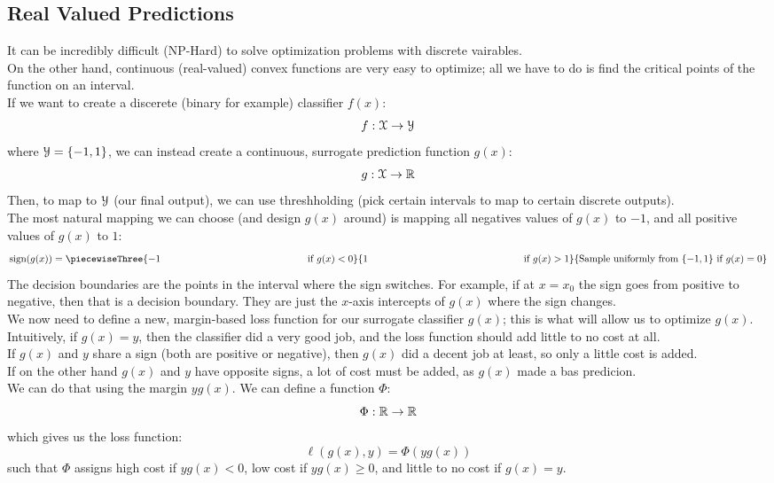 \documentclass[12pt]{article}
\begin{document}
\newpage

\subsection*{Real Valued Predictions}

It can be incredibly difficult (NP-Hard)
to solve optimization problems with
discrete vairables. \\
On the other hand, continuous (real-valued)
convex functions are very easy to optimize;
all we have to do is find the critical
points of the function on an interval. \\

If we want to create a discerete
(binary for example)
classifier $f(x)$:
\[ f: \mathcal{X} \to \mathcal{Y} \]
where $\mathcal{Y} = \{-1, 1\}$,
we can instead create
a continuous,
surrogate prediction function $g(x)$:
\[ g: \mathcal{X} \to \mathbb{R} \]
Then, to map to $\mathcal{Y}$ (our final output),
we can use threshholding 
(pick certain intervals to map to certain
discrete outputs). \\
The most natural mapping we can choose 
(and design $g(x)$ around)
is mapping all negatives values of $g(x)$
to $-1$,
and all positive values of $g(x)$ to $1$:
\[ \sign(g(x))
= \piecewiseThree{-1 \hspace{146pt} \IF g(x) < 0}
{1 \hspace{155pt} \IF g(x) > 1}
{\text{Sample uniformly from } \{-1, 1\}
\IF g(x) = 0} \]
The decision boundaries are the points
in the interval where the sign switches.
For example, if at $x = x_0$
the sign goes from positive to negative,
then that is a decision boundary.
They are just the $x$-axis intercepts
of $g(x)$ where the sign changes. \\

We now need to define a new, margin-based
loss function for our surrogate
classifier $g(x)$; this is what will allow
us to optimize $g(x)$. \\
Intuitively, if $g(x) = y$,
then the classifier did a very good job,
and the loss function should add little to
no cost at all. \\
If $g(x)$ and $y$ share a sign
(both are positive or negative),
then $g(x)$ did a decent job at least,
so only a little cost is added. \\
If on the other hand $g(x)$ and $y$
have opposite signs, a lot of cost must be
added, as $g(x)$ made a bas predicion. \\
We can do that using the margin $yg(x)$.
We can define a function $\Phi$:
\[ \Phi: \mathbb{R} \to \mathbb{R} \]
which gives us the loss function:
\[ \ell(g(x), y) = \Phi(yg(x)) \]
such that $\Phi$
assigns high cost if $yg(x) < 0$,
low cost if $yg(x) \geq 0$,
and little to no cost if $g(x) = y$. \\
\end{document}
